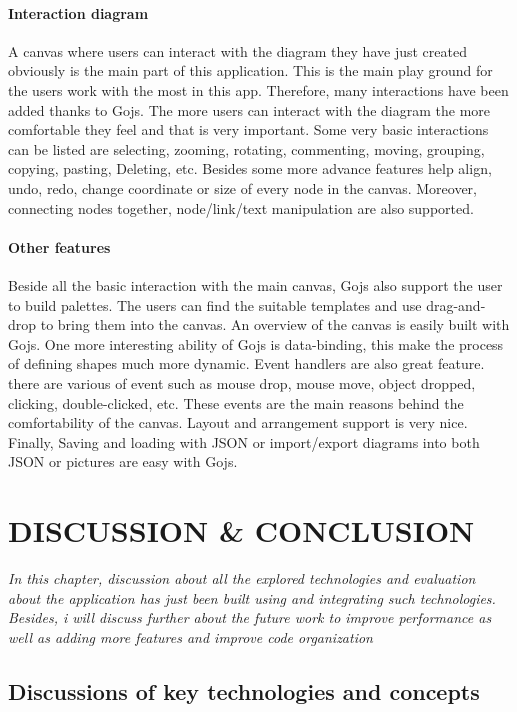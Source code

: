 \documentclass[14pt,a4paper]{extreport}
\begin{document}
			\subsubsection{Interaction diagram}
				A canvas where users can interact with the diagram they have just created obviously is the main part of this application. This is the main play ground for the users work with the most in this app. Therefore, many interactions have been added thanks to Gojs. The more users can interact with the diagram the more comfortable they feel and that is very important. Some very basic interactions can be listed are selecting, zooming, rotating, commenting, moving, grouping, copying, pasting, Deleting, etc. Besides some more advance features help align, undo, redo, change coordinate or size of every node in the canvas. Moreover, connecting nodes together, node/link/text manipulation are also supported.
			\subsubsection{Other features}
				Beside all the basic interaction with the main canvas, Gojs also support the user to build palettes. The users can find the suitable templates and use drag-and-drop to bring them into the canvas. An overview of the canvas is easily built with Gojs. One more interesting ability of Gojs is data-binding, this make the process of defining shapes much more dynamic. Event handlers are also great feature. there are various of event such as mouse drop, mouse move, object dropped, clicking, double-clicked, etc. These events are the main reasons behind the comfortability of the canvas. Layout and arrangement support is very nice. Finally, Saving and loading with JSON or import/export diagrams into both JSON or pictures are easy with Gojs.
		
\chapter{DISCUSSION \& CONCLUSION}
	\textsl{In this chapter, discussion about all the explored technologies and evaluation about the application has just been built using and integrating such technologies. Besides, i will discuss further about the future work to improve performance as well as adding more features and improve code organization}
	\newpage 
	
	\section{Discussions of key technologies and concepts}
\end{document}
